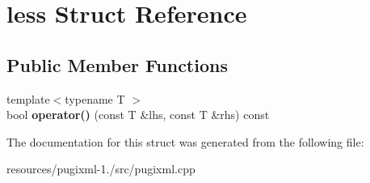 \hypertarget{structless}{\section{less Struct Reference}
\label{structless}
}
\subsection*{Public Member Functions}
\begin{DoxyCompactItemize}
\item 
\hypertarget{structless_ad467675b44baab18215475c7cba0cb48}{{\footnotesize template$<$typename T $>$ }\\bool {\bfseries operator()} (const T \&lhs, const T \&rhs) const }\label{structless_ad467675b44baab18215475c7cba0cb48}

\end{DoxyCompactItemize}


The documentation for this struct was generated from the following file\+:\begin{DoxyCompactItemize}
\item 
resources/pugixml-\/1./src/pugixml.\+cpp\end{DoxyCompactItemize}
